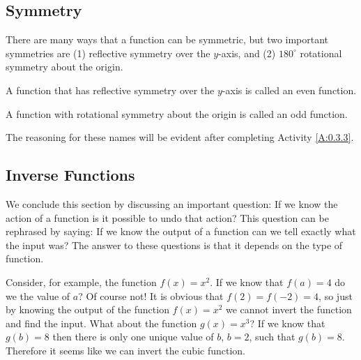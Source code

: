 \subsection*{Symmetry}
There are many ways that a function can be symmetric, but two important symmetries are (1)
reflective symmetry over the $y$-axis, and (2) $180^\circ$ rotational symmetry about the
origin.  
\begin{definition}
    A function that has reflective symmetry over the $y$-axis is called an even
function.
\end{definition}
\begin{definition}
    A function with rotational symmetry about the origin is called an odd
function.  
\end{definition}
The reasoning for these names will be evident after completing Activity
\ref{A:0.3.3}.



\subsection*{Inverse Functions}
We conclude this section by discussing an important question:  If we know the action of a
function is it possible to undo that action? This question can be rephrased by saying: If
we know the output of a function can we tell exactly what the input was?  The answer to
these questions is that it depends on the type of function.  

Consider, for example, the function $f(x) = x^2$.  If we know that $f(a) = 4$ do we the
value of $a$?  Of course not!  It is obvious that $f(2) = f(-2) = 4$, so just by knowing
the output of the function $f(x) = x^2$ we cannot invert the function and find the input.
What about the function $g(x) = x^3$?  If we know that $g(b) = 8$ then there is only one
unique value of $b$, $b=2$, such that $g(b) = 8$.  Therefore it seems like we can invert
the cubic function.  

